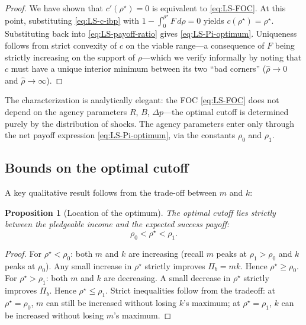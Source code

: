 \documentclass[11pt,a4paper,oneside]{book}
\def\leq{\leqslant}
\def\geq{\geqslant}
\theoremstyle{plain}
\newtheorem{proposition}[theorem]{Proposition}
\theoremstyle{definition}
\theoremstyle{remark}
\numberwithin{equation}{chapter}
\begin{document}
\begin{proof}
We have shown that $c'(\rho^\star) = 0$ is equivalent to \eqref{eq:LS-FOC}.
At this point, substituting \eqref{eq:LS-c-ibp} with $1 - \int_0^{\rho^\star} F \, d\rho = 0$ yields $c(\rho^\star) = \rho^\star$.
Substituting back into \eqref{eq:LS-payoff-ratio} gives \eqref{eq:LS-Pi-optimum}.
Uniqueness follows from strict convexity of $c$ on the viable range---a consequence of $F$ being strictly increasing on the support of $\rho$---which we verify informally by noting that $c$ must have a unique interior minimum between its two ``bad corners'' ($\widehat{\rho} \to 0$ and $\widehat{\rho} \to \infty$).
\end{proof}

The characterization is analytically elegant: the FOC \eqref{eq:LS-FOC} does not depend on the agency parameters $R$, $B$, $\Delta p$---the optimal cutoff is determined purely by the distribution of shocks.
The agency parameters enter only through the net payoff expression \eqref{eq:LS-Pi-optimum}, via the constants $\rho_0$ and $\rho_1$.

\subsection{Bounds on the optimal cutoff}

A key qualitative result follows from the trade-off between $m$ and $k$:

\begin{proposition}[Location of the optimum]\label{prop:LS-bounds}
The optimal cutoff lies strictly between the pledgeable income and the expected success payoff:
\begin{equation}\label{eq:LS-bounds}
  \rho_0 < \rho^\star < \rho_1.
\end{equation}
\end{proposition}

\begin{proof}
For $\rho^\star < \rho_0$: both $m$ and $k$ are increasing (recall $m$ peaks at $\rho_1 > \rho_0$ and $k$ peaks at $\rho_0$).
Any small increase in $\rho^\star$ strictly improves $\Pi_b = m k$.
Hence $\rho^\star \geq \rho_0$.
For $\rho^\star > \rho_1$: both $m$ and $k$ are decreasing.
A small decrease in $\rho^\star$ strictly improves $\Pi_b$.
Hence $\rho^\star \leq \rho_1$.
Strict inequalities follow from the tradeoff: at $\rho^\star = \rho_0$, $m$ can still be increased without losing $k$'s maximum; at $\rho^\star = \rho_1$, $k$ can be increased without losing $m$'s maximum.
\end{proof}
\end{document}
